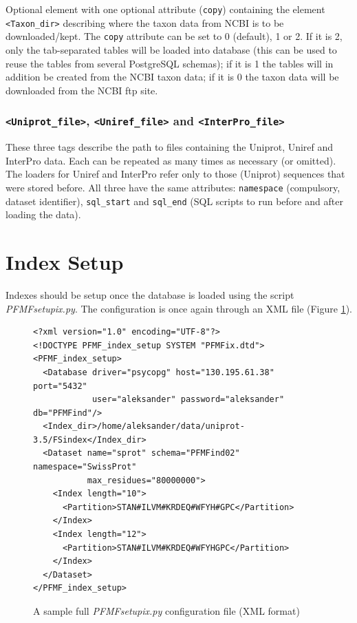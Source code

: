 \documentclass[11pt]{article}
\begin{document}
Optional element with one optional attribute ({\tt copy}) containing the element {\tt <Taxon\_dir>} describing where the taxon data from NCBI is to be downloaded/kept. The {\tt copy} attribute can be set to 0 (default), 1 or 2. If it is 2, only the tab-separated tables will be loaded into database (this can be used to reuse the tables from several PostgreSQL schemas); if it is 1 the tables will in addition be created from the NCBI taxon data; if it is 0 the taxon data will be downloaded from the NCBI ftp site. 

\subsubsection*{{\tt <Uniprot\_file>}, {\tt <Uniref\_file>} and {\tt <InterPro\_file>}}

These three tags describe the path to files containing the Uniprot, Uniref and InterPro data. Each can be repeated as many times as necessary (or omitted). The loaders for Uniref and InterPro refer only to those (Uniprot) sequences that were stored before. All three have the same attributes: \texttt{namespace} (compulsory, dataset identifier), \texttt{sql\_start} and \texttt{sql\_end} (SQL scripts to run before and after loading the data).

\section{Index Setup}

Indexes should be setup once the database is loaded using the script {\it PFMFsetupix.py}. The configuration is once again through an XML file (Figure \ref{fig:ixconfig}).

\begin{figure}[ht!]
\begin{verbatim}
<?xml version="1.0" encoding="UTF-8"?>
<!DOCTYPE PFMF_index_setup SYSTEM "PFMFix.dtd">
<PFMF_index_setup>
  <Database driver="psycopg" host="130.195.61.38" port="5432"
            user="aleksander" password="aleksander" db="PFMFind"/>
  <Index_dir>/home/aleksander/data/uniprot-3.5/FSindex</Index_dir>
  <Dataset name="sprot" schema="PFMFind02" namespace="SwissProt" 
           max_residues="80000000">
    <Index length="10">
      <Partition>STAN#ILVM#KRDEQ#WFYH#GPC</Partition>
    </Index>
    <Index length="12">
      <Partition>STAN#ILVM#KRDEQ#WFYHGPC</Partition>
    </Index>
  </Dataset>
</PFMF_index_setup>
\end{verbatim}
\caption{A sample full {\it PFMFsetupix.py} configuration file (XML format)}\label{fig:ixconfig}
\end{figure}
\end{document}
